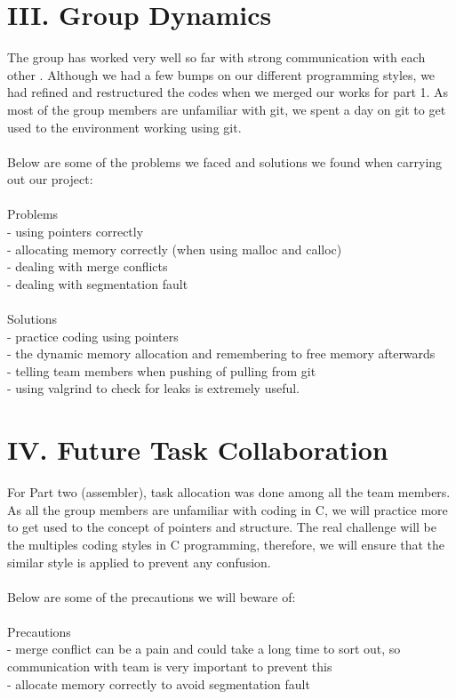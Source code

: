 \documentclass[11pt]{article}
\begin{document}
\section{III. Group Dynamics}

The group has worked very well so far with strong communication with each other
. Although we had a few bumps on our different programming styles, we had 
refined and restructured the codes when we merged our works for part 1. As most
 of the group members are unfamiliar with git, we spent a day on git to get 
used to the environment working using git. \\\\
Below are some of the problems we faced and solutions we found when carrying 
out our project:\\\\
 Problems\\	
 - using pointers correctly \\
 - allocating memory correctly (when using malloc and calloc)\\
 - dealing with merge conflicts \\
 - dealing with segmentation fault \\\\
 Solutions\\	
 - practice coding using pointers\\
 - the dynamic memory allocation and remembering to free memory afterwards\\ 
 - telling team members when pushing of pulling from git \\
 - using valgrind to check for leaks is extremely useful.\\

\section{IV. Future Task Collaboration}

For Part two (assembler), task allocation was done among all the team 
members. As all the group members are unfamiliar with coding in C, we will 
practice more to get used to the concept of pointers and structure. The real 
challenge will be the multiples coding styles in C programming, therefore, we 
will ensure that the similar style is applied to prevent any confusion.\\\\
 
Below are some of the precautions we will beware of:\\\\
 
Precautions\\	
 - merge conflict can be a pain and could take a long time to sort out, so 
communication with team is  very important to prevent this\\
 - allocate memory correctly to avoid segmentation fault \\\\
\end{document}
